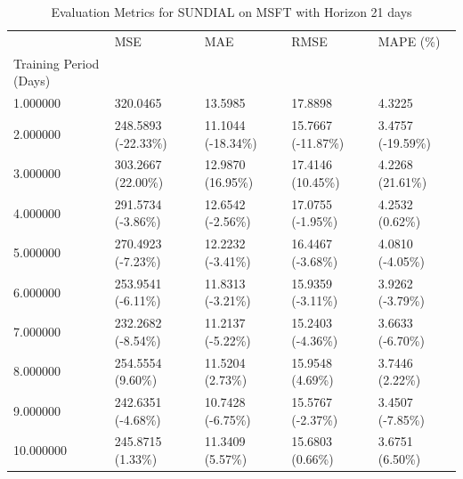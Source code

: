 \begin{table}
\caption{Evaluation Metrics for SUNDIAL on MSFT with Horizon 21 days}
\label{tab:sundial_MSFT_h21_metrics}
\begin{tabular}{lllll}
\toprule
 & MSE & MAE & RMSE & MAPE (\%) \\
Training Period (Days) &  &  &  &  \\
\midrule
1.000000 & 320.0465 & 13.5985 & 17.8898 & 4.3225 \\
2.000000 & 248.5893 (-22.33\%) & 11.1044 (-18.34\%) & 15.7667 (-11.87\%) & 3.4757 (-19.59\%) \\
3.000000 & 303.2667 (22.00\%) & 12.9870 (16.95\%) & 17.4146 (10.45\%) & 4.2268 (21.61\%) \\
4.000000 & 291.5734 (-3.86\%) & 12.6542 (-2.56\%) & 17.0755 (-1.95\%) & 4.2532 (0.62\%) \\
5.000000 & 270.4923 (-7.23\%) & 12.2232 (-3.41\%) & 16.4467 (-3.68\%) & 4.0810 (-4.05\%) \\
6.000000 & 253.9541 (-6.11\%) & 11.8313 (-3.21\%) & 15.9359 (-3.11\%) & 3.9262 (-3.79\%) \\
7.000000 & 232.2682 (-8.54\%) & 11.2137 (-5.22\%) & 15.2403 (-4.36\%) & 3.6633 (-6.70\%) \\
8.000000 & 254.5554 (9.60\%) & 11.5204 (2.73\%) & 15.9548 (4.69\%) & 3.7446 (2.22\%) \\
9.000000 & 242.6351 (-4.68\%) & 10.7428 (-6.75\%) & 15.5767 (-2.37\%) & 3.4507 (-7.85\%) \\
10.000000 & 245.8715 (1.33\%) & 11.3409 (5.57\%) & 15.6803 (0.66\%) & 3.6751 (6.50\%) \\
\bottomrule
\end{tabular}
\end{table}
